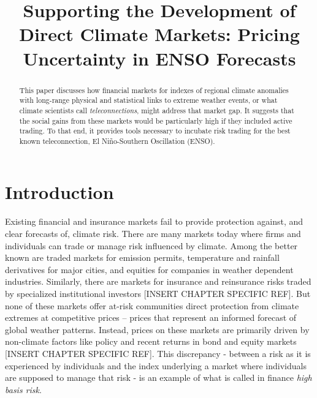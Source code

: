 \documentclass[authoryear]{article}
\begin{document}
\title{Supporting the Development of Direct Climate Markets: Pricing Uncertainty in ENSO Forecasts}
\date{}  %
%
%
%
%
%


\maketitle%
\begin{abstract}
This paper discusses how financial markets for indexes of regional climate anomalies with long-range physical and statistical links to extreme weather events, or what climate scientists call \emph{teleconnections}, might address that market gap. It suggests that the social gains from these markets would be particularly high if they included active trading. To that end, it provides tools necessary to incubate risk trading for the best known teleconnection, El Ni\~no-Southern Oscillation (ENSO).
\end{abstract}

\section{Introduction}
Existing financial and insurance markets fail to provide protection against, and clear forecasts of, climate risk. There are many markets today where firms and individuals can trade or manage risk influenced by climate. Among the better known are traded markets for emission permits, temperature and rainfall derivatives for major cities, and equities for companies in weather dependent industries. Similarly, there are markets for insurance and reinsurance risks traded by specialized institutional investors \citep{kurtov2010investing}[INSERT CHAPTER SPECIFIC REF]. But none of these markets offer at-risk communities direct protection from climate extremes at competitive prices – prices that represent an informed forecast of global weather patterns. Instead, prices on these markets are primarily driven by non-climate factors like policy and recent returns in bond and equity markets \citep{econ2013ETS} \citep{kurtov2010investing}[INSERT CHAPTER SPECIFIC REF]. This discrepancy - between a risk as it is experienced by individuals and the index underlying a market where individuals are supposed to manage that risk - is an example of what is called in finance \emph{high basis risk}.
\end{document}
